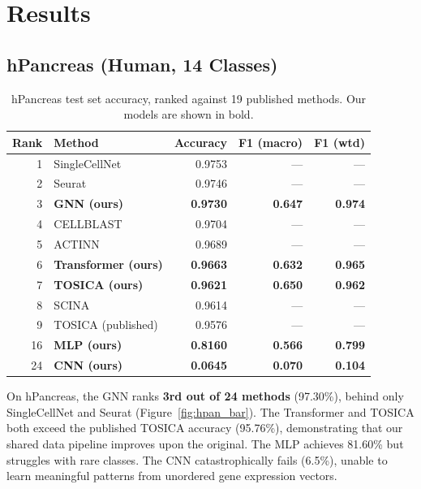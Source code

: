 \documentclass[11pt,letterpaper]{article}
\begin{document}
\section{Results}

\subsection{hPancreas (Human, 14 Classes)}

\begin{table}[H]
\centering
\caption{hPancreas test set accuracy, ranked against 19 published methods.
Our models are shown in bold.}
\label{tab:hpan}
\begin{tabular}{@{}rlrrr@{}}
\toprule
Rank & Method & Accuracy & F1 (macro) & F1 (wtd) \\
\midrule
1  & SingleCellNet          & 0.9753 & --- & --- \\
2  & Seurat                 & 0.9746 & --- & --- \\
3  & \textbf{GNN (ours)}    & \textbf{0.9730} & \textbf{0.647} & \textbf{0.974} \\
4  & CELLBLAST              & 0.9704 & --- & --- \\
5  & ACTINN                 & 0.9689 & --- & --- \\
6  & \textbf{Transformer (ours)} & \textbf{0.9663} & \textbf{0.632} & \textbf{0.965} \\
7  & \textbf{TOSICA (ours)} & \textbf{0.9621} & \textbf{0.650} & \textbf{0.962} \\
8  & SCINA                  & 0.9614 & --- & --- \\
9  & TOSICA (published)     & 0.9576 & --- & --- \\
16 & \textbf{MLP (ours)}    & \textbf{0.8160} & \textbf{0.566} & \textbf{0.799} \\
24 & \textbf{CNN (ours)}    & \textbf{0.0645} & \textbf{0.070} & \textbf{0.104} \\
\bottomrule
\end{tabular}
\end{table}

\noindent On hPancreas, the GNN ranks \textbf{3rd out of 24 methods} (97.30\%),
behind only SingleCellNet and Seurat (Figure~\ref{fig:hpan_bar}). The
Transformer and TOSICA both exceed the published TOSICA accuracy (95.76\%),
demonstrating that our shared data pipeline improves upon the original. The MLP
achieves 81.60\% but struggles with rare classes. The CNN catastrophically fails
(6.5\%), unable to learn meaningful patterns from unordered gene expression
vectors.
\end{document}
